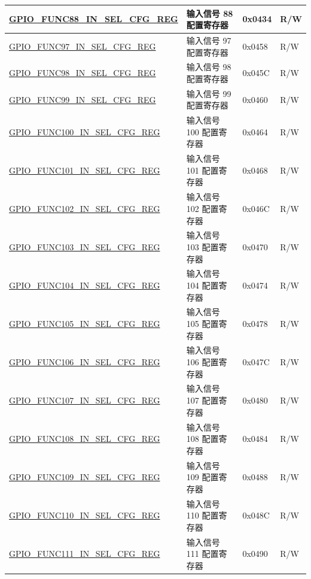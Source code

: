 \begin{longtable}{ | p{6cm} | p{7.2cm} | p{1.3cm} | p{1cm} | }
\hyperref[regdesc:GPIOFUNCTINSELCFGREG]{GPIO\_FUNC88\_IN\_SEL\_CFG\_REG} & 输入信号 88 配置寄存器 & 0x0434 & R/W \\ \hline
\hyperref[regdesc:GPIOFUNCUINSELCFGREG]{GPIO\_FUNC97\_IN\_SEL\_CFG\_REG} & 输入信号 97 配置寄存器 & 0x0458 & R/W \\ \hline
\hyperref[regdesc:GPIOFUNCUINSELCFGREG]{GPIO\_FUNC98\_IN\_SEL\_CFG\_REG} & 输入信号 98 配置寄存器 & 0x045C & R/W \\ \hline
\hyperref[regdesc:GPIOFUNCUINSELCFGREG]{GPIO\_FUNC99\_IN\_SEL\_CFG\_REG} & 输入信号 99 配置寄存器 & 0x0460 & R/W \\ \hline
\hyperref[regdesc:GPIOFUNCUINSELCFGREG]{GPIO\_FUNC100\_IN\_SEL\_CFG\_REG} & 输入信号 100 配置寄存器 & 0x0464 & R/W \\ \hline
\hyperref[regdesc:GPIOFUNCUINSELCFGREG]{GPIO\_FUNC101\_IN\_SEL\_CFG\_REG} & 输入信号 101 配置寄存器 & 0x0468 & R/W \\ \hline
\hyperref[regdesc:GPIOFUNCUINSELCFGREG]{GPIO\_FUNC102\_IN\_SEL\_CFG\_REG} & 输入信号 102 配置寄存器 & 0x046C & R/W \\ \hline
\hyperref[regdesc:GPIOFUNCUINSELCFGREG]{GPIO\_FUNC103\_IN\_SEL\_CFG\_REG} & 输入信号 103 配置寄存器 & 0x0470 & R/W \\ \hline
\hyperref[regdesc:GPIOFUNCUINSELCFGREG]{GPIO\_FUNC104\_IN\_SEL\_CFG\_REG} & 输入信号 104 配置寄存器 & 0x0474 & R/W \\ \hline
\hyperref[regdesc:GPIOFUNCUINSELCFGREG]{GPIO\_FUNC105\_IN\_SEL\_CFG\_REG} & 输入信号 105 配置寄存器 & 0x0478 & R/W \\ \hline
\hyperref[regdesc:GPIOFUNCUINSELCFGREG]{GPIO\_FUNC106\_IN\_SEL\_CFG\_REG} & 输入信号 106 配置寄存器 & 0x047C & R/W \\ \hline
\hyperref[regdesc:GPIOFUNCUINSELCFGREG]{GPIO\_FUNC107\_IN\_SEL\_CFG\_REG} & 输入信号 107 配置寄存器 & 0x0480 & R/W \\ \hline
\hyperref[regdesc:GPIOFUNCUINSELCFGREG]{GPIO\_FUNC108\_IN\_SEL\_CFG\_REG} & 输入信号 108 配置寄存器 & 0x0484 & R/W \\ \hline
\hyperref[regdesc:GPIOFUNCUINSELCFGREG]{GPIO\_FUNC109\_IN\_SEL\_CFG\_REG} & 输入信号 109 配置寄存器 & 0x0488 & R/W \\ \hline
\hyperref[regdesc:GPIOFUNCUINSELCFGREG]{GPIO\_FUNC110\_IN\_SEL\_CFG\_REG} & 输入信号 110 配置寄存器 & 0x048C & R/W \\ \hline
\hyperref[regdesc:GPIOFUNCUINSELCFGREG]{GPIO\_FUNC111\_IN\_SEL\_CFG\_REG} & 输入信号 111 配置寄存器 & 0x0490 & R/W \\ \hline

\end{longtable}
